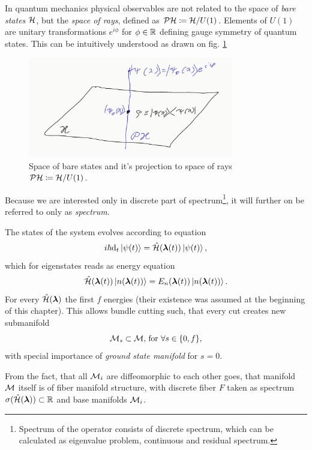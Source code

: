 In quantum mechanics physical observables are not related to the space of \emph{bare states} $\mathcal{H}$, but the \emph{space of rays}, defined as $\mathcal{PH}\coloneqq \mathcal{H}/U(1)$. Elements of $U(1)$ are unitary transformations $e^{i\phi}$ for $\phi\in\mathbb{R}$ defining gauge symmetry of quantum states. This can be intuitively understood as drawn on fig. \ref{fig:projectiveHilbertSpace}
\begin{figure}[h]
    \centering
    \includegraphics[width=0.8\textwidth]{../img/projectiveHilbertSpace.png}
\caption{Space of bare states and it's projection to space of rays $\mathcal{PH}\coloneqq \mathcal{H}/U(1)$.}
    \label{fig:projectiveHilbertSpace}
\end{figure}

Because we are interested only in discrete part of spectrum\footnote{Spectrum of the operator consists of discrete spectrum, which can be calculated as eigenvalue problem, continuous and residual spectrum.}, it will further on be referred to only as \emph{spectrum}. 

The states of the system evolves according to \Schrodinger equation
\begin{equation}
    i\hbar \mathrm{d}_t\ket{\psi(t)} = \hat{\mathcal{H}}({\bm\lambda}(t))\ket{\psi(t)},
    \label{eq:schrodinger}
\end{equation}
which for eigenstates reads as energy \Schrodinger equation
\begin{equation}
    \hat{\mathcal{H}}({\bm\lambda}(t))\ket{n({\bm\lambda}(t))}=E_n({\bm\lambda}(t))\ket{n({\bm\lambda}(t))}.
    \label{eq:energySchrodinger}
\end{equation}
For every $\hat{\mathcal{H}}({\bm\lambda})$ the first $f$ energies (their existence was assumed at the beginning of this chapter). This allows bundle cutting such, that every cut creates new submanifold $$\mathcal{M}_s\subset \mathcal{M} \text{, for } \forall s\in\{0,f\},$$
with special importance of \emph{ground state manifold} for $s=0$.

From the fact, that all $\mathcal{M}_i$ are diffeomorphic to each other goes, that manifold $\mathcal{M}$ itself is of fiber manifold structure, with discrete fiber $F$ taken as spectrum $\sigma(\hat{\mathcal{H}}({\bm\lambda}))\subset \mathbb{R}$ and base manifolds $\mathcal{M}_i$.

